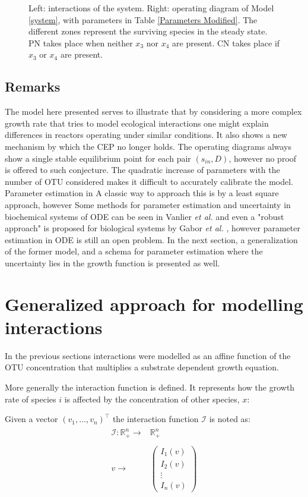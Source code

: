 \documentclass[3p,times]{elsarticle}
\newcommand{\R}{\mathbb{R}}
\newcommand{\I}{\mathcal{I}}
\begin{document}
\begin{figure}[ht]
\begin{subfigure}[b]{0.45\textwidth}
	\end{subfigure}
	\caption{Left: interactions of the system. Right: operating diagram of Model \eqref{system}, with parameters in Table \ref{Parameters Modified}. The different zones represent the surviving species in the steady state. PN takes place when neither $x_3$ nor $x_4$ are present. CN takes place if $x_3$ or $x_4$ are present.}
	\label{OD modified}
\end{figure}
\clearpage

\subsection{Remarks}

The model here presented serves to illustrate that by considering a more complex growth rate that tries to model ecological interactions one might explain differences in reactors operating under similar conditions. It also shows a new mechanism by which the CEP no longer holds. The operating diagrams always show a single stable equilibrium point for each pair $(s_{in},D)$, however no proof is offered to such conjecture.
The quadratic increase of parameters with the number of OTU considered makes it difficult to accurately calibrate the model. Parameter estimation in A classic way to approach this is by a least square approach, however Some methods for parameter estimation and uncertainty in biochemical systems of ODE can be seen in Vanlier \textit{et al.} \cite{Vanlier2013} and even a "robust approach" is proposed for biological systems by Gabor \textit{et al.} \cite{Gabor2015}, however parameter estimation in ODE is still an open problem. In the next section, a generalization of the former model, and a schema for parameter estimation where the uncertainty lies in the growth function is presented as well.


\section{Generalized approach for modelling interactions}
In the previous sections interactions were modelled as an affine function of the OTU concentration that multiplies a substrate dependent growth equation. 

More generally the interaction function is defined. It represents how the growth rate of species $i$ is affected by the concentration of other species, $x$:

Given a vector $(v_1,\dots,v_n)^\top$ the interaction function $\I$ is noted as:
\begin{align}
\begin{array}{rc}
\I: \R_+^n \rightarrow & \R_+^n\\
& \\
v \rightarrow & \begin{pmatrix}
I_1(v) \\
I_2(v) \\ 
\vdots  \\
I_n(v)
\end{pmatrix}
\end{array}
\end{align}
\end{document}
